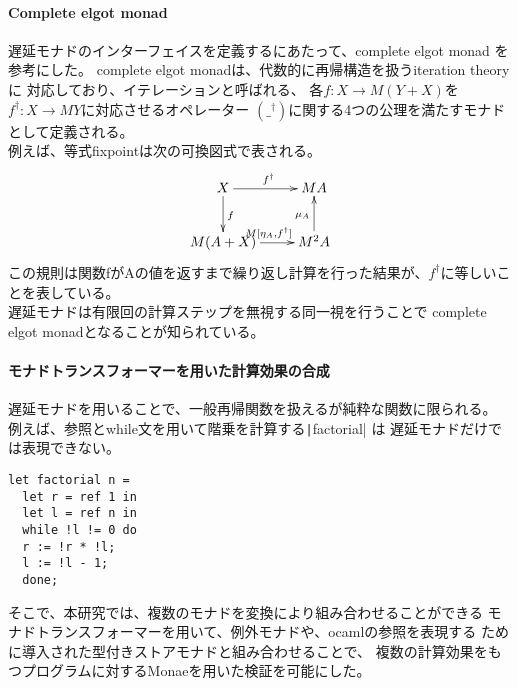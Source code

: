 \documentclass[japanese]{jssst_ppl}
\theoremstyle{definition}
\begin{document}
\paragraph{Complete elgot monad}
遅延モナドのインターフェイスを定義するにあたって、complete elgot monad\cite{ADAMEK20101306}
を参考にした。
complete elgot monadは、代数的に再帰構造を扱うiteration theory\cite{1993Bloom}に
対応しており、イテレーションと呼ばれる、
各$f : X \rightarrow M (Y + X)$を$f^{\dagger} : X \rightarrow M Y$に対応させるオペレーター
$(\_^{\dagger})$に関する4つの公理を満たすモナドとして定義される。\\
例えば、等式fixpointは次の可換図式で表される。
\xymatrixcolsep{2.5cm}
\[
  \xymatrix{
  X \ar[r]^{f^{\dagger}} \ar[d]^{f} & M A  \\
  M (A + X) \ar[r]^{M[\eta_A, f^{\dagger}]}  & M^2 A \ar[u]^{\mu_A}
  }
\]
この規則は関数fがAの値を返すまで繰り返し計算を行った結果が、$f^{\dagger}$に等しいことを表している。\\
遅延モナドは有限回の計算ステップを無視する同一視を行うことで
complete elgot monadとなることが知られている\cite{10.1007/978-3-319-67729-3_3}。

\paragraph{モナドトランスフォーマーを用いた計算効果の合成}
遅延モナドを用いることで、一般再帰関数を扱えるが純粋な関数に限られる。
例えば、参照とwhile文を用いて階乗を計算する\texttt|factorial| は
遅延モナドだけでは表現できない。
\begin{verbatim}
let factorial n =
  let r = ref 1 in
  let l = ref n in
  while !l != 0 do
  r := !r * !l;
  l := !l - 1;
  done;
\end{verbatim}
そこで、本研究では、複数のモナドを変換により組み合わせることができる
モナドトランスフォーマーを用いて、例外モナドや、ocamlの参照を表現する
ために導入された型付きストアモナド\cite{affeldt2023practicalformalizationmonadicequational}と組み合わせることで、
複数の計算効果をもつプログラムに対するMonaeを用いた検証を可能にした。
\end{document}
